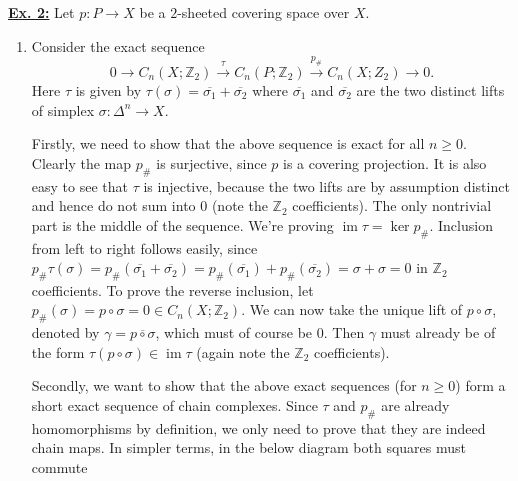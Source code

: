 \documentclass[a4paper, 12pt]{article}
\DeclareMathOperator{\im}{im}
\newcommand{\Z}{\mathbb{Z}}
\begin{document}
\underline{\textbf{Ex. 2:}}
Let $p \colon P \to X$ be a $2$-sheeted covering space over $X$.
\begin{enumerate}
	\item Consider the exact sequence
	\[
	0 \xrightarrow{} C_n(X;\Z_2) \xrightarrow{\tau} C_n(P; \Z_2) \xrightarrow{p_\#} C_n(X; Z_2) \xrightarrow{} 0.
	\]
	Here $\tau$ is given by $\tau(\sigma) = \overline{\sigma_1} + \overline{\sigma_2}$ where $\overline{\sigma_1}$ and $\overline{\sigma_2}$ are the two distinct lifts of simplex $\sigma\colon \Delta^n \to X$.
	
	Firstly, we need to show that the above sequence is exact for all $n \geq 0$.
	Clearly the map $p_\#$ is surjective, since $p$ is a covering projection. It is also easy to see that $\tau$ is injective, because the two lifts are by assumption distinct and hence do not sum into $0$ (note the $\Z_2$ coefficients). The only nontrivial part is the middle of the sequence. We're proving $\im\tau = \ker p_\#$. Inclusion from left to right follows easily, since $p_\#\tau(\sigma) = p_\#(\overline{\sigma_1} + \overline{\sigma_2}) = p_\#(\overline{\sigma_1}) + p_\#(\overline{\sigma_2}) = \sigma + \sigma = 0$ in $\Z_2$ coefficients. To prove the reverse inclusion, let $p_\#(\sigma) = p\circ\sigma = 0 \in C_n(X; \Z_2)$. We can now take the unique lift of $p\circ\sigma$, denoted by $\gamma = \overline{p\circ\sigma}$, which must of course be $0$. Then $\gamma$ must already be of the form $\tau(p\circ\sigma) \in \im\tau$ (again note the $\Z_2$ coefficients).
	
	Secondly, we want to show that the above exact sequences (for $n \geq 0$) form a short exact sequence of chain complexes. Since $\tau$ and $p_\#$ are already homomorphisms by definition, we only need to prove that they are indeed chain maps. In simpler terms, in the below diagram both squares must commute
	

\end{enumerate}
\end{document}
